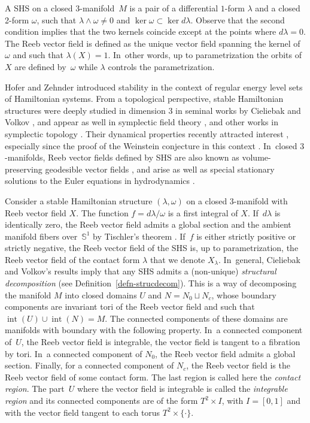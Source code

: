 \documentclass[JEP,XML,SOM,Unicode,NoEqCountersInSection,NoFloatCountersInSection,published]{cedram}
\newcommand{\threemanifold}{$3$\nobreakdash-mani\-fold\xspace}
\newcommand{\threemanifolds}{$3$\nobreakdash-mani\-folds\xspace}
\theoremstyle{definition}
\begin{document}
A SHS on a closed \threemanifold~$M$ is a pair of a differential $1$-form $\lambda$ and a closed 2-form $\omega$, such that $\lambda\wedge \omega\neq 0$ and $\ker \omega\subset \ker d\lambda$. Observe that the second condition implies that the two kernels coincide except at the points where $d\lambda=0$. The Reeb vector field is defined as the unique vector field spanning the kernel of $\omega$ and such that $\lambda(X)=1$. In~other words, up to parametrization the orbits of $X$ are defined by~$\omega$ while $\lambda$ controls the parametrization.

Hofer and Zehnder \cite{HZ} introduced stability in the context of regular energy level sets of Hamiltonian systems. From a topological perspective, stable Hamiltonian structures were deeply studied in dimension 3 in seminal works by Cieliebak and Volkov \cite{CV0, CV1}, and appear as well in symplectic field theory \cite{EGH, BEHWZ, CiMo}, and other works in symplectic topology \cite{EKP, W1, LW, NW, MNW,MS}. Their dynamical properties recently attracted interest \cite{CFP1,CFP2, MP, CV2, C}, especially since the proof of the Weinstein conjecture in this context \cite{HT, Re}. In~closed \threemanifolds, Reeb vector fields defined by SHS are also known as volume-preserving geodesible vector fields \cite{Re}, and arise as well as special stationary solutions to the Euler equations in hydrodynamics \cite{CV1}.

Consider a stable Hamiltonian structure $(\lambda,\omega)$ on a closed \threemanifold with Reeb vector field $X$. The function $f=d\lambda/\omega$ is a first integral of $X$. If~$d\lambda$ is identically zero, the Reeb vector field admits a global section and the ambient manifold fibers over~$\mathbb{S}^1$ by Tischler's theorem \cite{Tis}. If~$f$ is either strictly positive or strictly negative, the Reeb vector field of the SHS is, up to parametrization, the Reeb vector field of the contact form $\lambda$ that we denote $X_\lambda$. In~general, Cieliebak and Volkov's results \cite{CV1} imply that any SHS admits a (non-unique) \emph{structural decomposition} (see Definition~\ref{defn-strucdecom}). This is a way of decomposing the manifold $M$ into closed domains $U$ and $N=N_0\sqcup N_c$, whose boundary components are invariant tori of the Reeb vector field and such that $\operatorname{int}(U)\cup \operatorname{int}(N)=M$. The connected components of these domains are manifolds with boundary with the following property. In~a connected component of~$U$, the Reeb vector field is integrable, \ie the vector field is tangent to a fibration by tori. In~a connected component of $N_0$, the Reeb vector field admits a global section. Finally, for a connected component of $N_c$, the Reeb vector field is the Reeb vector field of some contact form. The last region is called here the \textit{contact region}. The part~$U$ where the vector field is integrable is called the \textit{integrable region} and its connected components are of the form $T^2\times I$, with $I=[0,1]$ and with the vector field tangent to each torus $T^2\times \{\cdot \}$.
\end{document}

